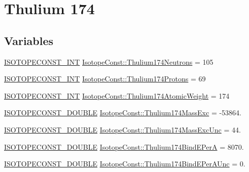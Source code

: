 \hypertarget{group___isotope_const-_thulium-_tm174}{}\section{Thulium 174}
\label{group___isotope_const-_thulium-_tm174}
\subsection*{Variables}
\begin{DoxyCompactItemize}
\item 
\mbox{\hyperlink{group___isotope_const-_macros_ga5f18360b3e99483a35c32d789e62621c}{I\+S\+O\+T\+O\+P\+E\+C\+O\+N\+S\+T\+\_\+\+I\+NT}} \mbox{\hyperlink{group___isotope_const-_thulium-_tm174_gaa5c4d7c972cfc9165defc3ff686f8e30}{Isotope\+Const\+::\+Thulium174\+Neutrons}} = 105
\item 
\mbox{\hyperlink{group___isotope_const-_macros_ga5f18360b3e99483a35c32d789e62621c}{I\+S\+O\+T\+O\+P\+E\+C\+O\+N\+S\+T\+\_\+\+I\+NT}} \mbox{\hyperlink{group___isotope_const-_thulium-_tm174_ga37a93dd29a0571c2e8e395f0ff843f3f}{Isotope\+Const\+::\+Thulium174\+Protons}} = 69
\item 
\mbox{\hyperlink{group___isotope_const-_macros_ga5f18360b3e99483a35c32d789e62621c}{I\+S\+O\+T\+O\+P\+E\+C\+O\+N\+S\+T\+\_\+\+I\+NT}} \mbox{\hyperlink{group___isotope_const-_thulium-_tm174_gab25c3e650d0b5f3802f008d9d4530898}{Isotope\+Const\+::\+Thulium174\+Atomic\+Weight}} = 174
\item 
\mbox{\hyperlink{group___isotope_const-_macros_ga8f45a7272ce02c0b4c65c44636ed719a}{I\+S\+O\+T\+O\+P\+E\+C\+O\+N\+S\+T\+\_\+\+D\+O\+U\+B\+LE}} \mbox{\hyperlink{group___isotope_const-_thulium-_tm174_ga657f48e975859df709e8978c31ad862c}{Isotope\+Const\+::\+Thulium174\+Mass\+Exc}} = -\/53864.
\item 
\mbox{\hyperlink{group___isotope_const-_macros_ga8f45a7272ce02c0b4c65c44636ed719a}{I\+S\+O\+T\+O\+P\+E\+C\+O\+N\+S\+T\+\_\+\+D\+O\+U\+B\+LE}} \mbox{\hyperlink{group___isotope_const-_thulium-_tm174_ga09cf52428f972a9a3b13b37f824b9d1c}{Isotope\+Const\+::\+Thulium174\+Mass\+Exc\+Unc}} = 44.
\item 
\mbox{\hyperlink{group___isotope_const-_macros_ga8f45a7272ce02c0b4c65c44636ed719a}{I\+S\+O\+T\+O\+P\+E\+C\+O\+N\+S\+T\+\_\+\+D\+O\+U\+B\+LE}} \mbox{\hyperlink{group___isotope_const-_thulium-_tm174_gad8201437560c84e4b0270f9fd861cac2}{Isotope\+Const\+::\+Thulium174\+Bind\+E\+PerA}} = 8070.
\item 
\mbox{\hyperlink{group___isotope_const-_macros_ga8f45a7272ce02c0b4c65c44636ed719a}{I\+S\+O\+T\+O\+P\+E\+C\+O\+N\+S\+T\+\_\+\+D\+O\+U\+B\+LE}} \mbox{\hyperlink{group___isotope_const-_thulium-_tm174_gafbdf3055f936657abb8b5bef9027aa2e}{Isotope\+Const\+::\+Thulium174\+Bind\+E\+Per\+A\+Unc}} = 0.

\end{DoxyCompactItemize}
